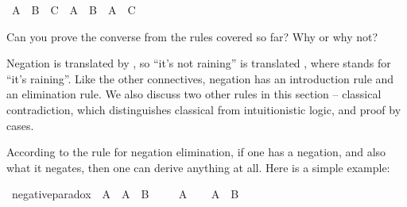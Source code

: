 \begin{isabellebody}
\begin{isamarkuptext}
\end{isamarkuptext}\isamarkuptrue%
\isamarkupfalse%
\ {\isachardoublequoteopen}A\ {\isasymor}\ B\ {\isasymand}\ C\ {\isasymlongrightarrow}\ {\isacharparenleft}A\ {\isasymor}\ B{\isacharparenright}\ {\isasymand}\ {\isacharparenleft}A\ {\isasymor}\ C{\isacharparenright}{\isachardoublequoteclose}%
\isadelimproof
\ %
\endisadelimproof
%
\isatagproof
{}\isamarkupfalse%
%
\endisatagproof
{\isafoldproof}%
%
\isadelimproof
%
\endisadelimproof
%
\begin{isamarkuptext}%
Can you prove the converse from the rules covered so far? Why or why not?%
\end{isamarkuptext}\isamarkuptrue%
%
\isadelimdocument
%
\endisadelimdocument
%
\isatagdocument
%
\isamarkuptrue%
%
\endisatagdocument
{\isafolddocument}%
%
\isadelimdocument
%
\endisadelimdocument
%
\begin{isamarkuptext}%
Negation is translated by \isa{{\isasymnot}}, so ``it's not raining'' is translated ,
where  stands for ``it's raining''. Like the other connectives, negation has an introduction
rule and an elimination rule. We also discuss two other rules in this section -- classical contradiction,
which distinguishes classical from intuitionistic logic, and proof by cases.%
\end{isamarkuptext}\isamarkuptrue%
%
\isadelimdocument
%
\endisadelimdocument
%
\isatagdocument
%
\isamarkuptrue%
%
\endisatagdocument
{\isafolddocument}%
%
\isadelimdocument
%
\endisadelimdocument
%
\begin{isamarkuptext}%
According to the rule for negation elimination, if one has a negation, and also what it
negates, then one can derive anything at all. Here is a simple example:%
\end{isamarkuptext}\isamarkuptrue%
\isamarkupfalse%
\ negative{\isacharunderscore}paradox{\isacharcolon}\ {\isachardoublequoteopen}{\isasymnot}\ A\ {\isasymlongrightarrow}\ A\ {\isasymlongrightarrow}\ B{\isachardoublequoteclose}\isanewline
%
\isadelimproof
%
\endisadelimproof
%
\isatagproof
{}\isamarkupfalse%
\isanewline
\ \ \isamarkupfalse%
\ {\isachardoublequoteopen}{\isasymnot}\ A{\isachardoublequoteclose}\isanewline
\ \ \isamarkupfalse%
\ {\isachardoublequoteopen}A\ {\isasymlongrightarrow}\ B{\isachardoublequoteclose}\isanewline
\ \ \isamarkupfalse%
\isanewline
\ \ \ \ \isamarkupfalse%

\end{isabellebody}
